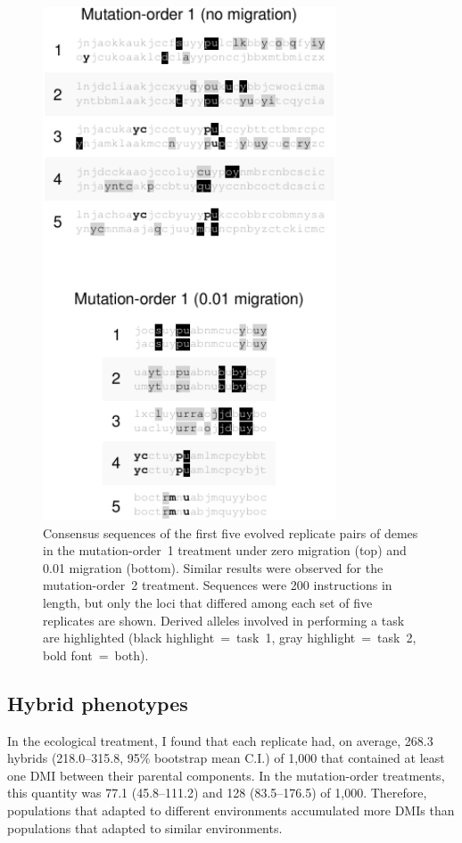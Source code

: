 \begin{doublespace}
\begin{figure}
\centering
\includegraphics[height=6in]{task-muts.pdf}
\caption{Consensus sequences of the first five evolved replicate pairs of demes
  in the mutation-order~1 treatment under zero migration (top)
  and 0.01 migration (bottom).
  Similar results were observed for the mu\-ta\-tion-order~2 treatment.
  Sequences were 200 instructions in length,
  but only the loci that differed among
  each set of five replicates are shown.
  Derived alleles involved in performing a task are highlighted
  (black highlight~=~task~1, gray highlight~=~task~2, bold font~=~both).}
\label{task_muts}
\end{figure}



\subsection{Hybrid phenotypes}

In the ecological treatment,
I found that each replicate had, on average,
268.3 hybrids (218.0--315.8, 95\% bootstrap mean C.I.) of 1,000
that contained at least one DMI between their parental components.
%
In the mutation-order treatments,
this quantity was 77.1 (45.8--111.2) and 128 (83.5--176.5) of 1,000.
%
Therefore, populations that adapted to different environments
accumulated more DMIs than populations that adapted to similar environments.




\end{doublespace}
